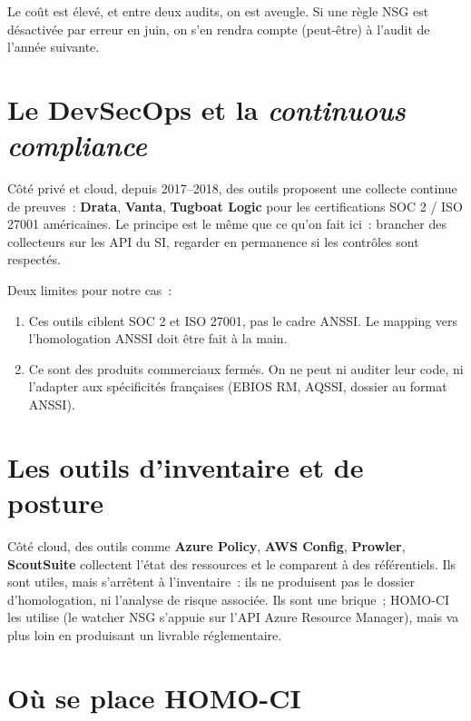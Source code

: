 Le coût est élevé, et entre deux audits, on est aveugle. Si une
règle NSG est désactivée par erreur en juin, on s'en rendra
compte (peut-être) à l'audit de l'année suivante.

\section{Le DevSecOps et la \emph{continuous compliance}}

Côté privé et cloud, depuis 2017--2018, des outils proposent une
collecte continue de preuves~: \textbf{Drata}, \textbf{Vanta},
\textbf{Tugboat Logic} pour les certifications SOC 2 / ISO 27001
américaines. Le principe est le même que ce qu'on fait ici~:
brancher des collecteurs sur les API du SI, regarder en
permanence si les contrôles sont respectés.

Deux limites pour notre cas~:

\begin{enumerate}
  \item Ces outils ciblent SOC 2 et ISO 27001, pas le cadre ANSSI.
    Le mapping vers l'homologation ANSSI doit être fait à la main.
  \item Ce sont des produits commerciaux fermés. On ne peut ni
    auditer leur code, ni l'adapter aux spécificités françaises
    (EBIOS RM, AQSSI, dossier au format ANSSI).
\end{enumerate}

\section{Les outils d'inventaire et de posture}

Côté cloud, des outils comme \textbf{Azure Policy},
\textbf{AWS Config}, \textbf{Prowler}, \textbf{ScoutSuite}
collectent l'état des ressources et le comparent à des
référentiels. Ils sont utiles, mais s'arrêtent à l'inventaire~:
ils ne produisent pas le dossier d'homologation, ni l'analyse de
risque associée. Ils sont une brique~; HOMO-CI les utilise (le
watcher NSG s'appuie sur l'API Azure Resource Manager), mais va
plus loin en produisant un livrable réglementaire.

\section{Où se place HOMO-CI}

